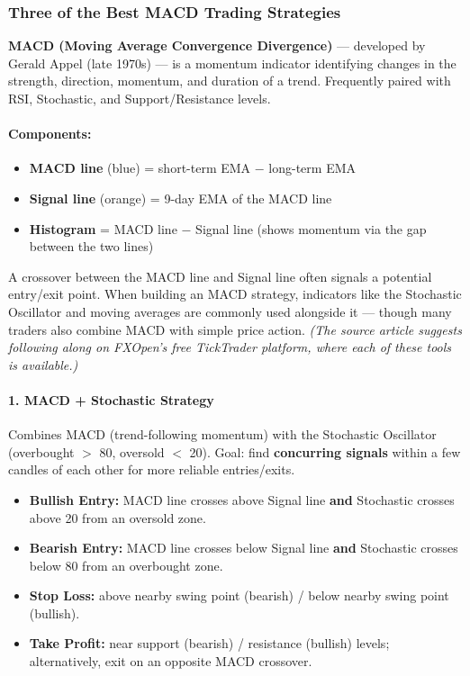 \documentclass[12pt,openany]{book}
\begin{document}
\subsubsection{Three of the Best MACD Trading Strategies}

\textbf{MACD (Moving Average Convergence Divergence)} --- developed by Gerald Appel (late 1970s) --- is a momentum indicator identifying changes in the strength, direction, momentum, and duration of a trend. Frequently paired with RSI, Stochastic, and Support/Resistance levels.

\paragraph{Components:}
\begin{itemize}[leftmargin=*]
    \item \textbf{MACD line} (blue) = short-term EMA \(-\) long-term EMA
    \item \textbf{Signal line} (orange) = 9-day EMA of the MACD line
    \item \textbf{Histogram} = MACD line \(-\) Signal line (shows momentum via the gap between the two lines)
\end{itemize}

A crossover between the MACD line and Signal line often signals a potential entry/exit point. When building an MACD strategy, indicators like the Stochastic Oscillator and moving averages are commonly used alongside it --- though many traders also combine MACD with simple price action. \emph{(The source article suggests following along on FXOpen's free TickTrader platform, where each of these tools is available.)}

\paragraph{1. MACD + Stochastic Strategy}

Combines MACD (trend-following momentum) with the Stochastic Oscillator (overbought \(>\) 80, oversold \(<\) 20). Goal: find \textbf{concurring signals} within a few candles of each other for more reliable entries/exits.

\begin{itemize}[leftmargin=*]
    \item \textbf{Bullish Entry:} MACD line crosses above Signal line \textbf{and} Stochastic crosses above 20 from an oversold zone.
    \item \textbf{Bearish Entry:} MACD line crosses below Signal line \textbf{and} Stochastic crosses below 80 from an overbought zone.
    \item \textbf{Stop Loss:} above nearby swing point (bearish) / below nearby swing point (bullish).
    \item \textbf{Take Profit:} near support (bearish) / resistance (bullish) levels; alternatively, exit on an opposite MACD crossover.
\end{itemize}
\end{document}
